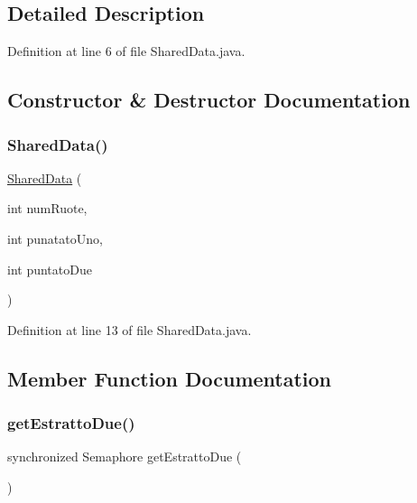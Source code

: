 \subsection{Detailed Description}


Definition at line 6 of file Shared\+Data.\+java.



\subsection{Constructor \& Destructor Documentation}
\mbox{\label{classmain_1_1_shared_data_a7c3fcf7e88661c8f19dc4f1bef3b1f1c}} 
\subsubsection{\texorpdfstring{Shared\+Data()}{SharedData()}}
{\footnotesize\ttfamily \mbox{\hyperlink{classmain_1_1_shared_data}{Shared\+Data}} (\begin{DoxyParamCaption}\item[{int}]{num\+Ruote,  }\item[{int}]{punatato\+Uno,  }\item[{int}]{puntato\+Due }\end{DoxyParamCaption})}



Definition at line 13 of file Shared\+Data.\+java.



\subsection{Member Function Documentation}
\mbox{\label{classmain_1_1_shared_data_a03babbf5685e678be2baebb70af3fc4e}} 
\subsubsection{\texorpdfstring{get\+Estratto\+Due()}{getEstrattoDue()}}
{\footnotesize\ttfamily synchronized Semaphore get\+Estratto\+Due (\begin{DoxyParamCaption}{ }\end{DoxyParamCaption})}



